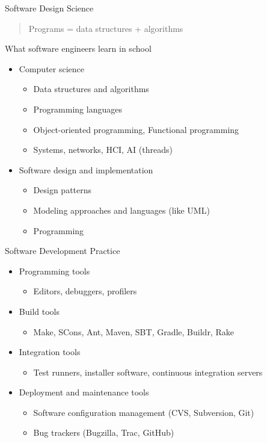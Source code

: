 \documentclass{beamer}
\begin{document}
\begin{frame}[fragile]{Software Design Science}

\begin{quote}
Programs = data structures + algorithms
\end{quote}
What software engineers learn in school
\begin{itemize}
\item Computer science
\begin{itemize}
\item Data structures and algorithms
\item Programming languages
\item Object-oriented programming, Functional programming
\item Systems, networks, HCI, AI (threads)
\end{itemize}
\item Software design and implementation
\begin{itemize}
\item Design patterns
\item Modeling approaches and languages (like UML)
\item Programming
\end{itemize}
\end{itemize}


\end{frame}

\begin{frame}[fragile]{Software Development Practice}


\begin{itemize}
\item Programming tools
\begin{itemize}
\item Editors, debuggers, profilers
\end{itemize}
\item Build tools
\begin{itemize}
\item Make, SCons, Ant, Maven, SBT, Gradle, Buildr, Rake
\end{itemize}
\item Integration tools
\begin{itemize}
\item Test runners, installer software, continuous integration servers
\end{itemize}
\item Deployment and maintenance tools
\begin{itemize}
\item Software configuration management (CVS, Subversion, Git)
\item Bug trackers (Bugzilla, Trac, GitHub)
\end{itemize}

\end{itemize}


\end{frame}
\end{document}
